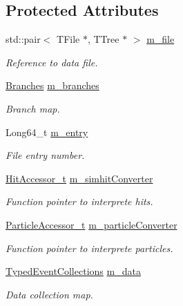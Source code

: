 \subsection*{Protected Attributes}
\begin{DoxyCompactItemize}
\item 
std\+::pair$<$ T\+File $\ast$, T\+Tree $\ast$ $>$ \hyperlink{class_d_d4hep_1_1_d_d_g4_event_handler_a0b53d1d20cca9b02b9f119c99832b503}{m\+\_\+file}
\begin{DoxyCompactList}\small\item\em Reference to data file. \end{DoxyCompactList}\item 
\hyperlink{class_d_d4hep_1_1_d_d_g4_event_handler_accd112cdbf8673e3a80d97e2d5c98241}{Branches} \hyperlink{class_d_d4hep_1_1_d_d_g4_event_handler_a33ae5f13b50b604cf914ba4d86aa3c35}{m\+\_\+branches}
\begin{DoxyCompactList}\small\item\em Branch map. \end{DoxyCompactList}\item 
Long64\+\_\+t \hyperlink{class_d_d4hep_1_1_d_d_g4_event_handler_ab28e33c8789d149c104fea42e39ba060}{m\+\_\+entry}
\begin{DoxyCompactList}\small\item\em File entry number. \end{DoxyCompactList}\item 
\hyperlink{class_d_d4hep_1_1_d_d_g4_event_handler_a523becfb4ac453b193adef28b8679d5c}{Hit\+Accessor\+\_\+t} \hyperlink{class_d_d4hep_1_1_d_d_g4_event_handler_a608844b86789ef2ccc8b7d088bdb7fe6}{m\+\_\+simhit\+Converter}
\begin{DoxyCompactList}\small\item\em Function pointer to interprete hits. \end{DoxyCompactList}\item 
\hyperlink{class_d_d4hep_1_1_d_d_g4_event_handler_a7087d24560986c2f222cd60bdf177b0a}{Particle\+Accessor\+\_\+t} \hyperlink{class_d_d4hep_1_1_d_d_g4_event_handler_abf82ae01b8dc3e3cfc84de48f42d4ce2}{m\+\_\+particle\+Converter}
\begin{DoxyCompactList}\small\item\em Function pointer to interprete particles. \end{DoxyCompactList}\item 
\hyperlink{class_d_d4hep_1_1_event_handler_a4d441ff8a824b1e2f278e8b7a6391af3}{Typed\+Event\+Collections} \hyperlink{class_d_d4hep_1_1_d_d_g4_event_handler_a11dcb61378ef3044f34723cc25aec8b7}{m\+\_\+data}
\begin{DoxyCompactList}\small\item\em Data collection map. \end{DoxyCompactList}\end{DoxyCompactItemize}


